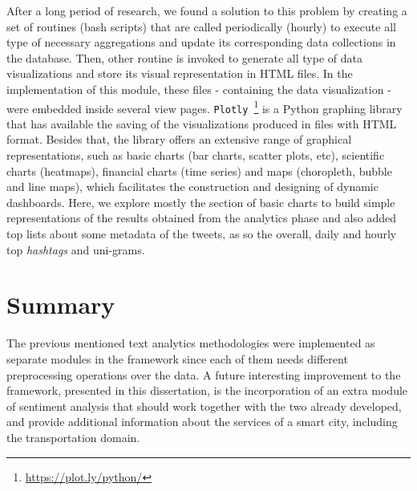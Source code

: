 After a long period of research, we found a solution to this problem by creating a set of routines (bash scripts) that are called periodically (hourly) to execute all type of necessary aggregations and update its corresponding data collections in the database. Then, other routine is invoked to generate all type of data visualizations and store its visual representation in \gls{HTML} files. In the implementation of this module, these files - containing the data visualization - were embedded inside several view pages. \texttt{Plotly}~\footnote{\url{https://plot.ly/python/}} is a Python graphing library that has available the saving of the visualizations produced in files with \gls{HTML} format. Besides that, the library offers an extensive range of graphical representations, such as basic charts (bar charts, scatter plots, etc), scientific charts (heatmaps), financial charts (time series) and maps (choropleth, bubble and line maps), which facilitates the construction and designing of dynamic dashboards. Here, we explore mostly the section of basic charts to build simple representations of the results obtained from the analytics phase and also added top lists about some metadata of the tweets, as so the overall, daily and hourly top \textit{hashtags} and uni-grams.

\section{Summary}
The previous mentioned text analytics methodologies were implemented as separate modules in the framework since each of them needs different preprocessing operations over the data. A future interesting improvement to the framework, presented in this dissertation, is the incorporation of an extra module of sentiment analysis that should work together with the two already developed, and provide additional information about the services of a smart city, including the transportation domain.